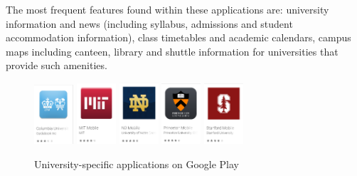         The most frequent features found within these applications are: university information and news (including syllabus, admissions and student accommodation information), class timetables and academic calendars, campus maps including canteen, library and shuttle information for universities that provide such amenities.
        
        \begin{figure}[ht]
            \centering
                 \includegraphics[width=0.13\textwidth]{figures/uni_apps/store_entries/columbia.png}
                 \includegraphics[width=0.13\textwidth]{figures/uni_apps/store_entries/mit.png}
                 \includegraphics[width=0.13\textwidth]{figures/uni_apps/store_entries/notre_dame.png}
                 \includegraphics[width=0.13\textwidth]{figures/uni_apps/store_entries/princeton.png}
                 \includegraphics[width=0.13\textwidth]{figures/uni_apps/store_entries/stanford.png}
            \caption{University-specific applications on Google Play}
            \label{2:fig:uni_apps}
        \end{figure}
    
